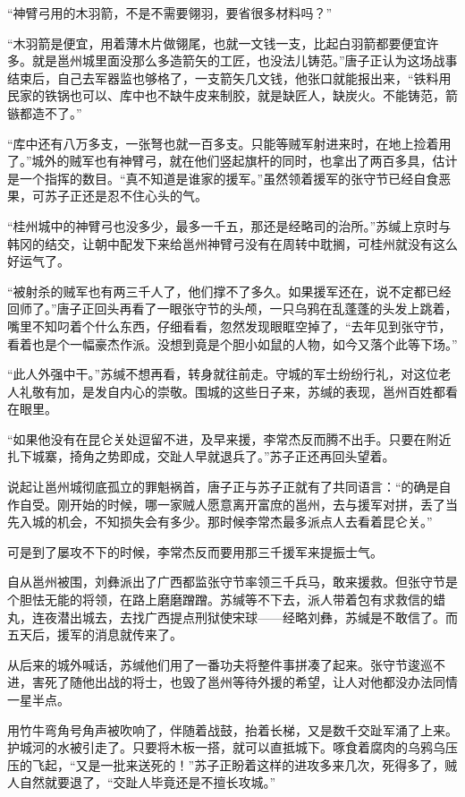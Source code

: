 “神臂弓用的木羽箭，不是不需要翎羽，要省很多材料吗？”

“木羽箭是便宜，用着薄木片做翎尾，也就一文钱一支，比起白羽箭都要便宜许多。就是邕州城里面没那么多造箭矢的工匠，也没法儿铸范。”唐子正认为这场战事结束后，自己去军器监也够格了，一支箭矢几文钱，他张口就能报出来，“铁料用民家的铁锅也可以、库中也不缺牛皮来制胶，就是缺匠人，缺炭火。不能铸范，箭镞都造不了。”

“库中还有八万多支，一张弩也就一百多支。只能等贼军射进来时，在地上捡着用了。”城外的贼军也有神臂弓，就在他们竖起旗杆的同时，也拿出了两百多具，估计是一个指挥的数目。“真不知道是谁家的援军。”虽然领着援军的张守节已经自食恶果，可苏子正还是忍不住心头的气。

“桂州城中的神臂弓也没多少，最多一千五，那还是经略司的治所。”苏缄上京时与韩冈的结交，让朝中配发下来给邕州神臂弓没有在周转中耽搁，可桂州就没有这么好运气了。

“被射杀的贼军也有两三千人了，他们撑不了多久。如果援军还在，说不定都已经回师了。”唐子正回头再看了一眼张守节的头颅，一只乌鸦在乱蓬蓬的头发上跳着，嘴里不知叼着个什么东西，仔细看看，忽然发现眼眶空掉了，“去年见到张守节，看着也是个一幅豪杰作派。没想到竟是个胆小如鼠的人物，如今又落个此等下场。”

“此人外强中干。”苏缄不想再看，转身就往前走。守城的军士纷纷行礼，对这位老人礼敬有加，是发自内心的崇敬。围城的这些日子来，苏缄的表现，邕州百姓都看在眼里。

“如果他没有在昆仑关处逗留不进，及早来援，李常杰反而腾不出手。只要在附近扎下城寨，掎角之势即成，交趾人早就退兵了。”苏子正还再回头望着。

说起让邕州城彻底孤立的罪魁祸首，唐子正与苏子正就有了共同语言：“的确是自作自受。刚开始的时候，哪一家贼人愿意离开富庶的邕州，去与援军对拼，丢了当先入城的机会，不知损失会有多少。那时候李常杰最多派点人去看着昆仑关。”

可是到了屡攻不下的时候，李常杰反而要用那三千援军来提振士气。

自从邕州被围，刘彝派出了广西都监张守节率领三千兵马，敢来援救。但张守节是个胆怯无能的将领，在路上磨磨蹭蹭。苏缄等不下去，派人带着包有求救信的蜡丸，连夜潜出城去，去找广西提点刑狱使宋球——经略刘彝，苏缄是不敢信了。而五天后，援军的消息就传来了。

从后来的城外喊话，苏缄他们用了一番功夫将整件事拼凑了起来。张守节逡巡不进，害死了随他出战的将士，也毁了邕州等待外援的希望，让人对他都没办法同情一星半点。

用竹牛弯角号角声被吹响了，伴随着战鼓，抬着长梯，又是数千交趾军涌了上来。护城河的水被引走了。只要将木板一搭，就可以直抵城下。啄食着腐肉的乌鸦乌压压的飞起，“又是一批来送死的！”苏子正盼着这样的进攻多来几次，死得多了，贼人自然就要退了，“交趾人毕竟还是不擅长攻城。”

